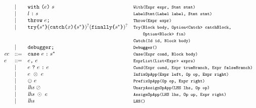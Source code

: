 \[\begin{array}{llll}
& \mid & {\tt with} \ \verb+(+\expr\verb+)+ \ \stmt & \mtt{With(Expr expr, Stmt stmt)}\\
& \mid & 
l \; \verb+:+ \; \stmt & \mtt{LabelStmt(Label label, Stmt stmt)}\\
& \mid & {\tt throw} \ \expr \verb+;+ & \mtt{Throw(Expr expr)}\\
& \mid &
{\tt try} \verb+{+\stmt^*\verb+}+ ({\tt catch} \verb+(+\myid\verb+)+ \verb+{+\stmt^*\verb+}+)^? ({\tt finally} \verb+{+\stmt^*\verb+}+)^?
& \mtt{Try(Block body, Option<Catch> catchBlock,}\\
&&& \mtt{\phantom{Try(}Option<Block> fin)}\\
&&& \mtt{Catch(Id id, Block body)}\\
& \mid & {\tt debugger} \verb+;+ & \mtt{Debugger()}\\

\cc &::=& {\tt case} \ \expr \; \verb+:+ \; \stmt^{*} & \mtt{Case(Expr cond, Block body)}\\

\expr &::=& \expr\verb+,+ \ \expr & \mtt{ExprList(List<Expr> exprs)}\\
  &\mid& \expr \ \verb+?+ \ \expr \ \verb+:+ \ \expr & \mtt{Cond(Expr cond, Expr trueBranch, Expr falseBranch)}\\
  &\mid& \expr \ \inop \ \expr & \mtt{InfixOpApp(Expr left, Op op, Expr right)}\\
  &\mid& \preop \ \expr & \mtt{PrefixOpApp(Op op, Expr right)}\\
  &\mid& \lhs \ \postop & \mtt{UnaryAssignOpApp(LHS lhs, Op op)}\\
  &\mid& \lhs \ \aop \ \expr & \mtt{AssignOpApp(LHS lhs, Op op, Expr right)}\\
  &\mid& \lhs & \mtt{LHS()}\\
\end{array}
\]

